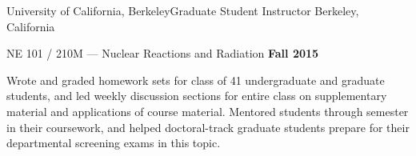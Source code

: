 
\begin{rSubsection}{University of California, Berkeley}{}{Graduate Student Instructor}{ Berkeley, California}
\item    NE 101 / 210M --- Nuclear Reactions and Radiation  \hfill {\bf Fall 2015}

\begin{list1}
\item[] Wrote and graded homework sets  for class of 41
undergraduate and graduate students, and led weekly discussion sections for entire class on supplementary material and applications of course material.
Mentored students through semester in their coursework, and helped doctoral-track graduate students prepare for their departmental screening exams in this topic.

\vspace*{.05in}  

\end{list1}
\end{rSubsection}
% 
% 


% 
% 
% 
% 




